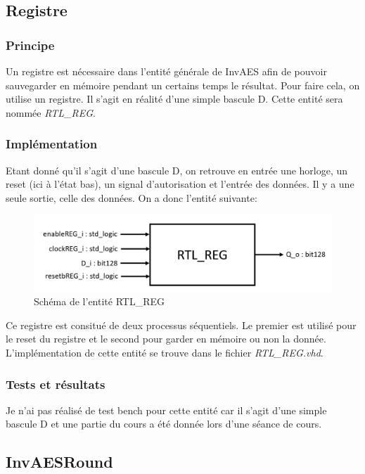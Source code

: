 \documentclass[a4paper, 12pt]{article}
\begin{document}
	\subsection{Registre}
		\subsubsection{Principe}
	Un registre est nécessaire dans l'entité générale de InvAES afin de pouvoir sauvegarder en mémoire pendant un certains temps le résultat. Pour faire cela, on utilise un registre. Il s'agit en réalité d'une simple bascule D. Cette entité sera nommée \emph{RTL\_REG}. 
	
		\subsubsection{Implémentation}
Etant donné qu'il s'agit d'une bascule D, on retrouve en entrée une horloge, un reset (ici à l'état bas), un signal d'autorisation et l'entrée des données. Il y a une seule sortie, celle des données. On a donc l'entité suivante:
			\begin{figure}[H]
				\begin{center}
				\includegraphics[scale=0.4]{Images/REGEntity.png}
				\end{center}
				\caption{Schéma de l'entité RTL\_REG}
				\label{REGEntity}
			\end{figure}
Ce registre est consitué de deux processus séquentiels. Le premier est utilisé pour le reset du registre et le second pour garder en mémoire ou non la donnée.
	L'implémentation de cette entité se trouve dans le fichier \emph{RTL\_REG.vhd}. 
		
		\subsubsection{Tests et résultats}
	Je n'ai pas réalisé de test bench pour cette entité car il s'agit d'une simple bascule D et une partie du cours a été donnée lors d'une séance de cours.

	\subsection{InvAESRound}
\end{document}
